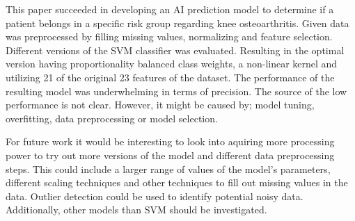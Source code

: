 This paper succeeded in developing an AI prediction model to determine if a patient belongs in a specific risk group regarding knee osteoarthritis. Given data was preprocessed by filling missing values, normalizing and feature selection. Different versions of the SVM classifier was evaluated. Resulting in the optimal version having proportionality balanced class weights, a non-linear kernel and utilizing 21 of the original 23 features of the dataset. The performance of the resulting model was underwhelming in terms of precision. The source of the low performance is not clear. However, it might be caused by; model tuning, overfitting, data preprocessing or model selection. 

For future work it would be interesting to look into aquiring more processing power to try out more versions of the model and different data preprocessing steps. This could include a larger range of values of the model's parameters, different scaling techniques and other techniques to fill out missing values in the data. Outlier detection could be used to identify potential noisy data. Additionally, other models than SVM should be investigated.              
